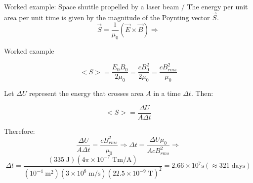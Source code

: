 {\begin{frame}{Worked example: Space shuttle propelled by a laser beam /}
The energy per unit area per unit time is given by the magnitude of the
Poynting vector $\vec{S}$.
\begin{equation*}
  \vec{S} = \frac{1}{\mu_0} (\vec{E} \times \vec{B}) \Rightarrow
\end{equation*}

\end{frame}

%
%
%
%

\begin{frame}{Worked example}

\begin{equation*}
  <S> = \frac{E_0 B_0}{2\mu_0} = \frac{c B_0^2}{2\mu_0} = \frac{c B_{rms}^2}{\mu_0}
\end{equation*}

Let $\Delta U$ represent the energy that crosses
area $A$ in a time $\Delta t$. Then:

\begin{equation*}
  <S> = \frac{\Delta U}{A \Delta t}
\end{equation*}

Therefore:
\begin{equation*}
  \frac{\Delta U}{A \Delta t} = \frac{c B_{rms}^2}{\mu_0} \Rightarrow
  \Delta t = \frac{\Delta U \mu_0}{A c B_{rms}^2} \Rightarrow
\end{equation*}
\begin{equation*}
  \Delta t =
  \frac
  {
    (335 \; \text{J})
    (4\pi \times 10^{-7} \; \text{Tm/A})
  }
  {
    (10^{-4} \; \text{m}^2)
    (3 \times 10^{8} \; \text{m/s})
    (22.5 \times 10^{-9} \; \text{T})^2
  } =
  2.66 \times 10^7 \text{s} ( \approx 321 \; \text{days})
\end{equation*}

\end{frame}

} %


%
%

